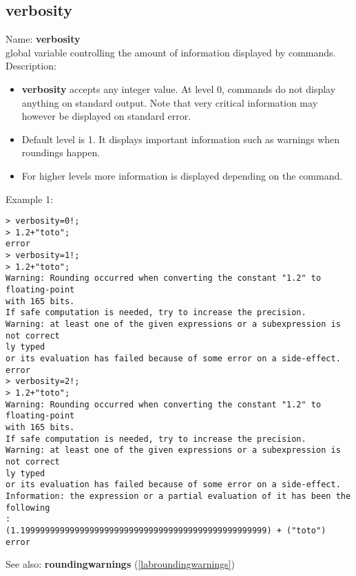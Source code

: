 \subsection{verbosity}
\label{labverbosity}
\noindent Name: \textbf{verbosity}\\
global variable controlling the amount of information displayed by commands.\\
\noindent Description: \begin{itemize}

\item \textbf{verbosity} accepts any integer value. At level 0, commands do not display anything
   on standard output. Note that very critical information may however be displayed on
   standard error.

\item Default level is 1. It displays important information such as warnings when 
   roundings happen.

\item For higher levels more information is displayed depending on the command.
\end{itemize}
\noindent Example 1: 
\begin{center}\begin{minipage}{15cm}\begin{Verbatim}[frame=single]
> verbosity=0!;
> 1.2+"toto";
error
> verbosity=1!;
> 1.2+"toto";
Warning: Rounding occurred when converting the constant "1.2" to floating-point 
with 165 bits.
If safe computation is needed, try to increase the precision.
Warning: at least one of the given expressions or a subexpression is not correct
ly typed
or its evaluation has failed because of some error on a side-effect.
error
> verbosity=2!;
> 1.2+"toto";
Warning: Rounding occurred when converting the constant "1.2" to floating-point 
with 165 bits.
If safe computation is needed, try to increase the precision.
Warning: at least one of the given expressions or a subexpression is not correct
ly typed
or its evaluation has failed because of some error on a side-effect.
Information: the expression or a partial evaluation of it has been the following
:
(1.19999999999999999999999999999999999999999999999999) + ("toto")
error
\end{Verbatim}
\end{minipage}\end{center}
See also: \textbf{roundingwarnings} (\ref{labroundingwarnings})
